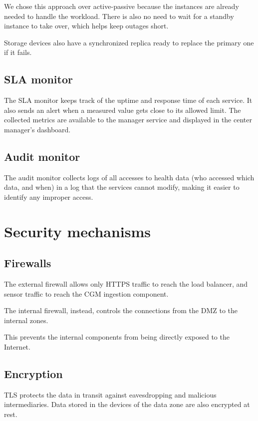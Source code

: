 We chose this approach
over active-passive because the instances are already needed to handle the
workload. There is also no need to wait for a standby instance to take over,
which helps keep outages short.

Storage devices also have a synchronized
replica ready to replace the primary one if it fails.

\subsection{SLA monitor}

The SLA monitor keeps track of the uptime and response time of each service.
It also sends an alert when a measured value gets close to its allowed limit.
The collected metrics are available to the manager service and displayed
in the center manager's dashboard.

\subsection{Audit monitor}

The audit monitor collects logs of all accesses to health data (who accessed which data, and
when) in a log that the services cannot modify, making it easier to identify
any improper access.

\section{Security mechanisms}
\label{sec:mech-security}

\subsection{Firewalls}


The external firewall allows only HTTPS traffic to reach the load balancer,
and sensor traffic to reach the CGM ingestion component. 

The internal firewall, instead,
controls the connections from the DMZ to the internal zones.

This prevents the
internal components from being directly exposed to the Internet.

\subsection{Encryption}

TLS protects the data in transit against eavesdropping and malicious
intermediaries. Data stored in the devices of the
data zone are also encrypted at rest. 

